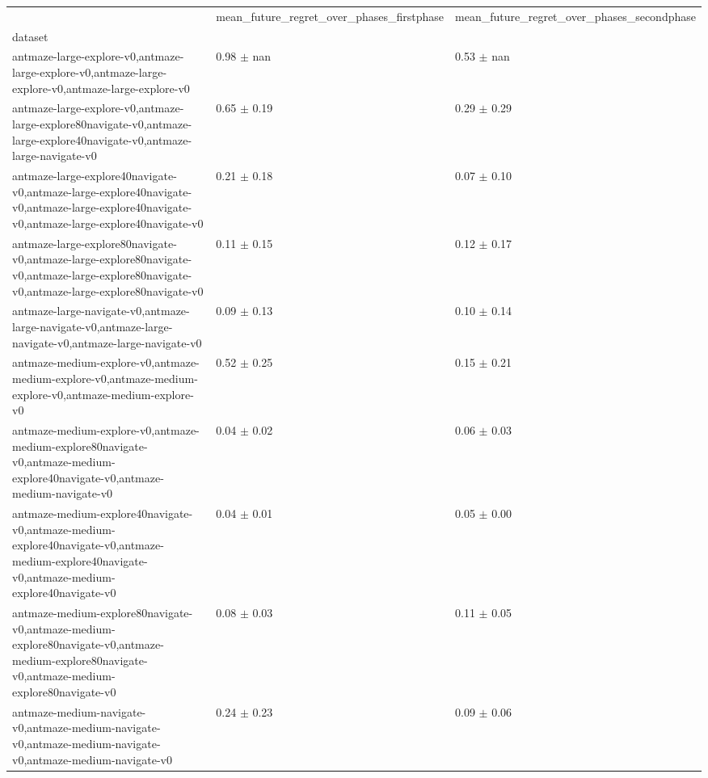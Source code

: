 \begin{tabular}{lll}
\toprule
 & mean_future_regret_over_phases_firstphase & mean_future_regret_over_phases_secondphase \\
dataset &  &  \\
\midrule
antmaze-large-explore-v0,antmaze-large-explore-v0,antmaze-large-explore-v0,antmaze-large-explore-v0 & 0.98 $\pm$ nan & 0.53 $\pm$ nan \\
antmaze-large-explore-v0,antmaze-large-explore80navigate-v0,antmaze-large-explore40navigate-v0,antmaze-large-navigate-v0 & 0.65 $\pm$ 0.19 & 0.29 $\pm$ 0.29 \\
antmaze-large-explore40navigate-v0,antmaze-large-explore40navigate-v0,antmaze-large-explore40navigate-v0,antmaze-large-explore40navigate-v0 & 0.21 $\pm$ 0.18 & 0.07 $\pm$ 0.10 \\
antmaze-large-explore80navigate-v0,antmaze-large-explore80navigate-v0,antmaze-large-explore80navigate-v0,antmaze-large-explore80navigate-v0 & 0.11 $\pm$ 0.15 & 0.12 $\pm$ 0.17 \\
antmaze-large-navigate-v0,antmaze-large-navigate-v0,antmaze-large-navigate-v0,antmaze-large-navigate-v0 & 0.09 $\pm$ 0.13 & 0.10 $\pm$ 0.14 \\
antmaze-medium-explore-v0,antmaze-medium-explore-v0,antmaze-medium-explore-v0,antmaze-medium-explore-v0 & 0.52 $\pm$ 0.25 & 0.15 $\pm$ 0.21 \\
antmaze-medium-explore-v0,antmaze-medium-explore80navigate-v0,antmaze-medium-explore40navigate-v0,antmaze-medium-navigate-v0 & 0.04 $\pm$ 0.02 & 0.06 $\pm$ 0.03 \\
antmaze-medium-explore40navigate-v0,antmaze-medium-explore40navigate-v0,antmaze-medium-explore40navigate-v0,antmaze-medium-explore40navigate-v0 & 0.04 $\pm$ 0.01 & 0.05 $\pm$ 0.00 \\
antmaze-medium-explore80navigate-v0,antmaze-medium-explore80navigate-v0,antmaze-medium-explore80navigate-v0,antmaze-medium-explore80navigate-v0 & 0.08 $\pm$ 0.03 & 0.11 $\pm$ 0.05 \\
antmaze-medium-navigate-v0,antmaze-medium-navigate-v0,antmaze-medium-navigate-v0,antmaze-medium-navigate-v0 & 0.24 $\pm$ 0.23 & 0.09 $\pm$ 0.06 \\
\bottomrule
\end{tabular}
